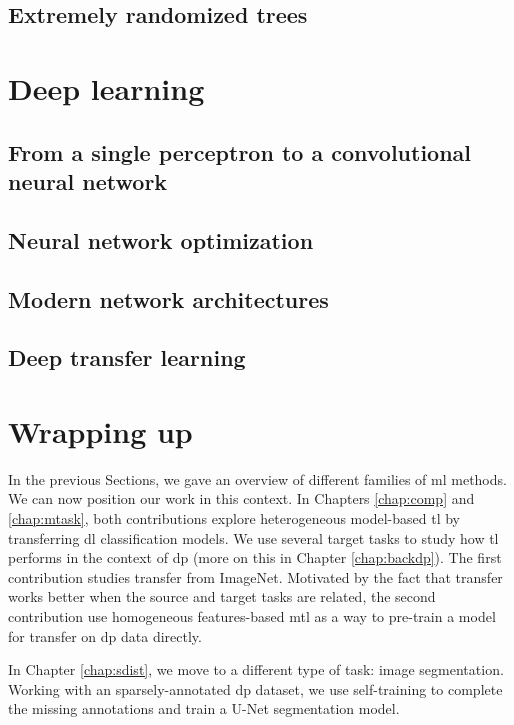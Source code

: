 \subsection{Extremely randomized trees}

\section{Deep learning}
\label{sec:backml:deeplearning}

\subsection{From a single perceptron to a convolutional neural network}

\subsection{Neural network optimization}

\subsection{Modern network architectures}

\subsection{Deep transfer learning}



\section{Wrapping up}

In the previous Sections, we gave an overview of different families of \acrlong{ml} methods. We can now position our work in this context. In Chapters \ref{chap:comp} and \ref{chap:mtask}, both contributions explore heterogeneous model-based \acrlong{tl} by transferring \acrlong{dl} classification models. We use several target tasks to study how \acrlong{tl} performs in the context of \acrlong{dp} (more on this in Chapter \ref{chap:backdp}). The first contribution studies transfer from ImageNet. Motivated by the fact that transfer works better when the source and target tasks are related, the second contribution use homogeneous features-based \acrlong{mtl} as a way to pre-train a model for transfer on \acrlong{dp} data directly.

In Chapter \ref{chap:sdist}, we move to a different type of task: image segmentation. Working with an sparsely-annotated \acrlong{dp} dataset, we use self-training to complete the missing annotations and train a U-Net segmentation model.  

